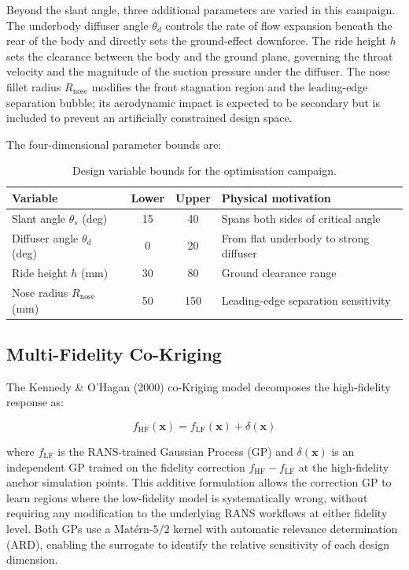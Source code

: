 Beyond the slant angle, three additional parameters are varied in this campaign. The underbody diffuser angle $\theta_d$ controls the rate of flow expansion beneath the rear of the body and directly sets the ground-effect downforce. The ride height $h$ sets the clearance between the body and the ground plane, governing the throat velocity and the magnitude of the suction pressure under the diffuser. The nose fillet radius $R_\mathrm{nose}$ modifies the front stagnation region and the leading-edge separation bubble; its aerodynamic impact is expected to be secondary but is included to prevent an artificially constrained design space.

The four-dimensional parameter bounds are:

\begin{table}[h]
    \centering
    \caption{Design variable bounds for the optimisation campaign.}
    \label{tab:design_variables}
    \begin{tabular}{lccl}
        \toprule
        Variable & Lower & Upper & Physical motivation \\
        \midrule
        Slant angle $\theta_s$ (deg) & 15 & 40 & Spans both sides of critical angle \\
        Diffuser angle $\theta_d$ (deg) & 0 & 20 & From flat underbody to strong diffuser \\
        Ride height $h$ (mm) & 30 & 80 & Ground clearance range \\
        Nose radius $R_\mathrm{nose}$ (mm) & 50 & 150 & Leading-edge separation sensitivity \\
        \bottomrule
    \end{tabular}
\end{table}

\subsection{Multi-Fidelity Co-Kriging}

The Kennedy \& O'Hagan (2000) co-Kriging model \cite{kennedy2000} decomposes the high-fidelity response as:

\begin{equation}
    f_\mathrm{HF}(\mathbf{x}) = f_\mathrm{LF}(\mathbf{x}) + \delta(\mathbf{x})
    \label{eq:cokriging}
\end{equation}

where $f_\mathrm{LF}$ is the RANS-trained Gaussian Process (GP) and $\delta(\mathbf{x})$ is an independent GP trained on the fidelity correction $f_\mathrm{HF} - f_\mathrm{LF}$ at the high-fidelity anchor simulation points. This additive formulation allows the correction GP to learn regions where the low-fidelity model is systematically wrong, without requiring any modification to the underlying RANS workflows at either fidelity level. Both GPs use a Mat\'{e}rn-$5/2$ kernel with automatic relevance determination (ARD), enabling the surrogate to identify the relative sensitivity of each design dimension.

